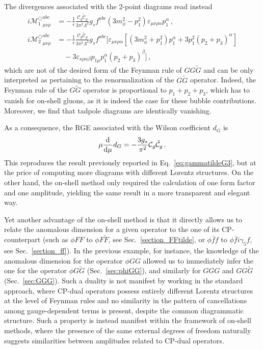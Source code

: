 The divergences associated with the 2-point diagrams 
read instead 
\begin{align}
    i {\mathcal M_{1}^\bigcirc}_{\mu\nu\rho}^{abc} &= -\frac{1}{\epsilon}\frac{\mathcal C_g \tilde{\mathcal C}_g}{3\pi^2\Lambda^2}g_sf^{abc}(3m_\phi^2 -p_1^2)\varepsilon_{\mu\nu\rho\alpha}p_1^\alpha \,,
    \\
    i {\mathcal M_{2}^\bigcirc}_{\mu\nu\rho}^{abc} &= -\frac{1}{\epsilon}\frac{\mathcal C_g \tilde{\mathcal C}_g}{3\pi^2\Lambda^2}g_sf^{abc}
    \big[
    \varepsilon_{\mu\nu\rho\alpha}[(3m_\phi^2+p_1^2)p_1^\alpha 
    +3p_1^2 (p_2+p_3)^\alpha ]\nonumber \\
    &\quad -3\varepsilon_{\nu\rho\alpha\beta}p_{1\mu}p_1^\alpha(p_2+p_3)^\beta
    \big]\,,
\end{align}
%
%
which are not of the desired form of the Feynman rule of $GG\tilde G$ and can be only interpreted as pertaining to the renormalization of the $G\tilde G$ operator.
Indeed, the Feynman rule of the $G\tilde G$ operator is proportional to $p_1+p_2+p_3$, which has to vanish for on-shell gluons, as it is indeed the case for these bubble contributions.
Moreover, we find that tadpole diagrams are identically vanishing. 

As a consequence, the RGE associated with the Wilson coefficient $d_G$ is
\begin{equation}
    \mu\dv[]{}{\mu}d_G = -\frac{3g_s}{\pi^2}\mathcal C_g \tilde{\mathcal C}_g\,.
\end{equation}
%
This reproduces the result previously reported in Eq.~\eqref{eq:gammatildeG3},
but at the price of computing more diagrams with different Lorentz structures.
On the other hand, the on-shell method only required the calculation of one form factor and one amplitude, yielding the same result in a more transparent and elegant way.

Yet another advantage of the on-shell method is that it directly allows us to relate the anomalous dimension for a given operator to the one of its CP-counterpart (such as $\phi FF$ to $\phi F \tilde F$, see Sec.~\ref{section_FFtilde}, or $\phi \bar f f$ to $ \phi \bar f i \gamma_5 f$, see Sec.~\ref{section_ff}).
In the previous example, for instance, the knowledge of the anomalous dimension for the operator $\phi GG$ allowed us to immediately infer the one for the operator $\phi G\tilde G$ (Sec.~\ref{sec:phiGG}), and similarly for $GGG$ and $GG \tilde{G}$ (Sec.~\ref{sec:GGG}).
Such a duality is not manifest by working in the standard approach, where CP-dual operators possess entirely different Lorentz structures at the level of Feynman rules and no similarity in the pattern of cancellations among gauge-dependent terms is present, despite the common diagrammatic structure.
Such a property is instead manifest within the framework of on-shell methods, where the presence of the same external degrees of freedom naturally suggests similarities between amplitudes related to CP-dual operators. 